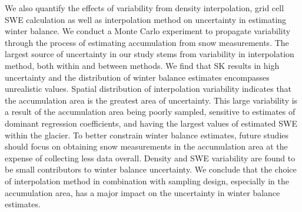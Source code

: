 \documentclass[twocolumn, letterpaper]{igs}
\begin{document}
We also quantify the effects of variability from density interpolation, grid cell SWE calculation as well as interpolation method on uncertainty in estimating winter balance. We conduct a Monte Carlo experiment to propagate variability through the process of estimating accumulation from snow measurements. The largest source of uncertainty in our study stems from variability in interpolation method, both within and between methods. We find that SK results in high uncertainty and the distribution of winter balance estimates  encompasses unrealistic values. Spatial distribution of interpolation variability indicates that the accumulation area is the greatest area of uncertainty. This large variability is a result of the accumulation area being poorly sampled, sensitive to estimates of dominant regression coefficients, and having the largest values of estimated SWE within the glacier. To better constrain winter balance estimates, future studies should focus on obtaining snow measurements in the accumulation area at the expense of collecting less data overall. Density and SWE variability are found to be small contributors to winter balance uncertainty. We conclude that the choice of interpolation method in combination with sampling design, especially in the accumulation area, has a major impact on the uncertainty in winter balance estimates.



%

%


\end{document}
